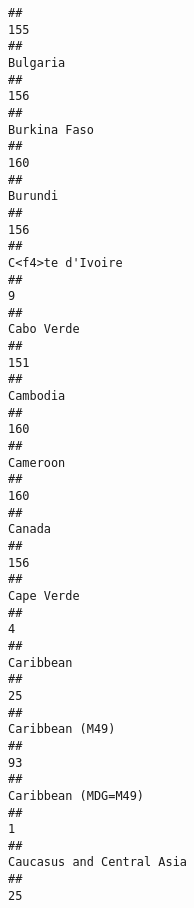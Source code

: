 \documentclass[]{article}
\begin{document}
\begin{verbatim}
##                                                                                          155 
##                                                                                     Bulgaria 
##                                                                                          156 
##                                                                                 Burkina Faso 
##                                                                                          160 
##                                                                                      Burundi 
##                                                                                          156 
##                                                                             C<f4>te d'Ivoire 
##                                                                                            9 
##                                                                                   Cabo Verde 
##                                                                                          151 
##                                                                                     Cambodia 
##                                                                                          160 
##                                                                                     Cameroon 
##                                                                                          160 
##                                                                                       Canada 
##                                                                                          156 
##                                                                                   Cape Verde 
##                                                                                            4 
##                                                                                    Caribbean 
##                                                                                           25 
##                                                                              Caribbean (M49) 
##                                                                                           93 
##                                                                          Caribbean (MDG=M49) 
##                                                                                            1 
##                                                                    Caucasus and Central Asia 
##                                                                                           25 

\end{verbatim}
\end{document}
